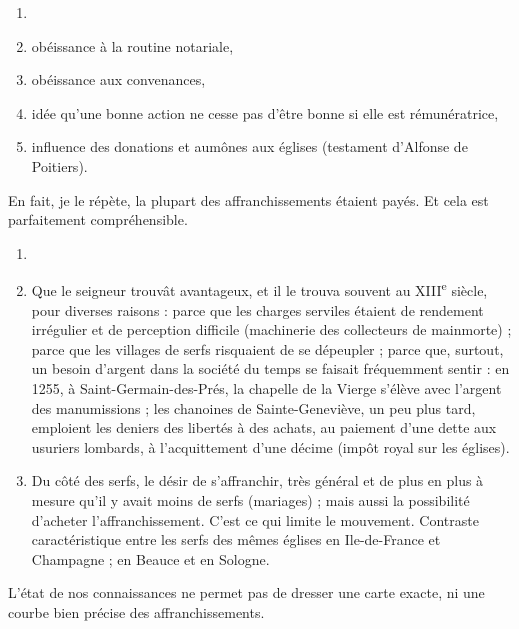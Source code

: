 \documentclass[french,twoside]{book} %
\begin{document}
\begin{enumerate}[itemsep=0pt,]
\item[] \hspace{-1.5em}{\bfseries Il y a :}
\item obéissance à la routine notariale,
\item obéissance aux convenances,
\item idée qu’une bonne action ne cesse pas d’être bonne si elle est rémunératrice,
\item influence des donations et aumônes aux églises (testament d’Alfonse de Poitiers).

\end{enumerate}\noindent En fait, je le répète, la plupart des affranchissements étaient payés. Et cela est parfaitement compréhensible.\par

\begin{enumerate}[itemsep=0pt,]
\item[] \hspace{-1.5em}{\bfseries Il fallait donc deux conditions :}
\item Que le seigneur trouvât avantageux, et il le trouva souvent au XIII\textsuperscript{e} siècle, pour diverses raisons : parce que les charges serviles étaient de rendement irrégulier et de perception difficile (machinerie  
\label{p61} des collecteurs de mainmorte) ; parce que les villages de serfs risquaient de se dépeupler ; parce que, surtout, un besoin d’argent dans la société du temps se faisait fréquemment sentir : en 1255, à Saint-Germain-des-Prés, la chapelle de la Vierge s’élève avec l’argent des manumissions ; les chanoines de Sainte-Geneviève, un peu plus tard, emploient les deniers des libertés à des achats, au paiement d’une dette aux usuriers lombards, à l’acquittement d’une décime (impôt royal sur les églises).
\item Du côté des serfs, le désir de s’affranchir, très général et de plus en plus à mesure qu’il y avait moins de serfs (mariages) ; mais aussi la possibilité d’acheter l’affranchissement. C’est ce qui limite le mouvement. Contraste caractéristique entre les serfs des mêmes églises en Ile-de-France et Champagne ; en Beauce et en Sologne.

\end{enumerate}\noindent L’état de nos connaissances ne permet pas de dresser une carte exacte, ni une courbe bien précise des affranchissements.\par
\end{document}
